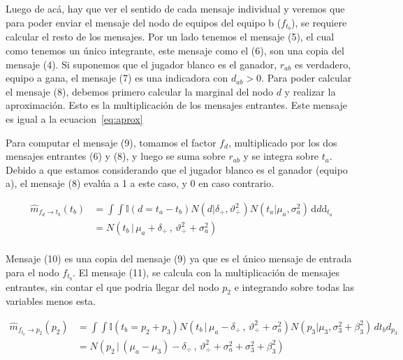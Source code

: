 \documentclass[11pt,twoside,spanish]{report} %
\begin{document}
Luego de ac\'a, hay que ver el sentido de cada mensaje individual y veremos que para poder enviar el mensaje del nodo de equipos del equipo b ($f_{t_b}$), se requiere calcular el resto de los mensajes.
Por un lado tenemos el mensaje (5), el cual como tenemos un \'unico integrante, este mensaje como el (6), son una copia del mensaje (4).
Si suponemos que el jugador blanco es el ganador, $r_{ab}$ es verdadero, equipo a gana, el mensaje (7) es una indicadora con $d_{ab}>0$.
Para poder calcular el mensaje (8), debemos primero calcular la marginal del nodo $d$ y realizar la aproximaci\'on.
Esto es la multiplicaci\'on de los mensajes entrantes.
Este mensaje es igual a la ecuacion~\ref{eq:aprox}

Para computar el mensaje (9), tomamos el factor $f_d$, multiplicado por los dos mensajes entrantes (6) y (8), y luego se suma sobre $r_{ab}$ y se integra sobre $t_a$.
Debido a que estamos considerando que el jugador blanco es el ganador (equipo a), el mensaje (8) eval\'ua a 1 a este caso, y 0 en caso contrario.

\begin{equation}
\begin{split}
\widehat{m}_{f_{d} \rightarrow t_b}(t_b)  & = \int \int \mathbb{I}(d = t_a - t_b) N(d | \delta_{\div}, \vartheta_{\div}^2) N(t_a | \mu_a , \sigma_a^2 )  \, \text{d}{d} \text{d}_{t_a} \\
&= N(t_b \, | \, \mu_a + \delta_{\div} \, , \, \vartheta_{\div}^2 + \sigma_a^2) \\
\end{split}
\end{equation}

Mensaje (10) es una copia del mensaje (9) ya que es el \'unico mensaje de entrada para el nodo $f_{t_b}$.
El mensaje (11), se calcula con la multiplicaci\'on de mensajes entrantes, sin contar el que podria llegar del nodo $p_2$ e integrando sobre todas las variables menos esta.

\begin{equation}
\begin{split}
\widehat{m}_{f_{t_b} \rightarrow p_2}(p_2)  & =\int \int \mathbb{I}(t_b = p_2 + p_3) N(t_b \, | \, \mu_a - \delta_{\div} \, , \, \vartheta_{\div}^2 + \sigma_a^2) N(p_3 | \mu_3 , \sigma_3^2 + \beta_3^2)  \, d{t_b} d_{p_3} \\
&=  N( p_2 \,|\,  (\mu_a - \mu_3) - \delta_{\div}  \,,\,\vartheta_{\div}^2 + \sigma_a^2 + \sigma_3^2 + \beta_3^2)  \\
\end{split}
\end{equation}
\end{document}
